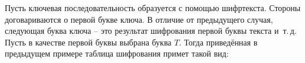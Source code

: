 \example 
Пусть ключевая последовательность образуется с помощью шифртекста. Стороны договариваются о первой букве ключа. В отличие от предыдущего случая, следующая буква ключа -- это результат шифрования первой буквы текста и~т.\,д. Пусть в качестве первой буквы выбрана буква $T$. Тогда приведённая в предыдущем примере таблица шифрования примет такой вид:
\begin{center}  \end{center}
\exampleend
